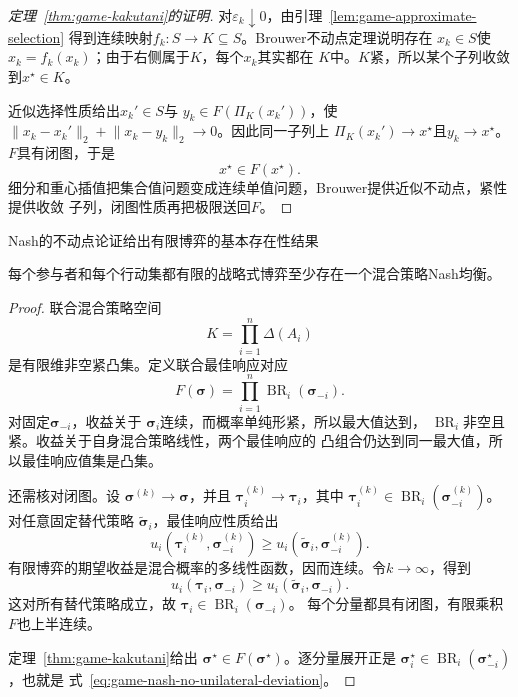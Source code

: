 \begin{proof}[定理~\ref{thm:game-kakutani}的证明]
对\(\varepsilon_k\downarrow0\)，由引理~\ref{lem:game-approximate-selection}
得到连续映射\(f_k:S\to K\subseteq S\)。Brouwer不动点定理说明存在
\(x_k\in S\)使\(x_k=f_k(x_k)\)；由于右侧属于\(K\)，每个\(x_k\)其实都在
\(K\)中。\(K\)紧，所以某个子列收敛到\(x^\star\in K\)。

近似选择性质给出\(x_k'\in S\)与
\(y_k\in F(\Pi_K(x_k'))\)，使
\(\lVert x_k-x_k'\rVert_2+\lVert x_k-y_k\rVert_2\to0\)。因此同一子列上
\(\Pi_K(x_k')\to x^\star\)且\(y_k\to x^\star\)。\(F\)具有闭图，于是
\[
  x^\star\in F(x^\star).
\]
细分和重心插值把集合值问题变成连续单值问题，Brouwer提供近似不动点，紧性提供收敛
子列，闭图性质再把极限送回\(F\)。
\end{proof}
Nash的不动点论证给出有限博弈的基本存在性结果
\begin{theorem}[有限博弈存在混合Nash均衡]
\label{thm:game-nash-existence}
每个参与者和每个行动集都有限的战略式博弈至少存在一个混合策略Nash均衡。
\end{theorem}

\begin{proof}
联合混合策略空间
\[
  K=\prod_{i=1}^{n}\Delta(A_i)
\]
是有限维非空紧凸集。定义联合最佳响应对应
\[
  F(\bm{\sigma})
  =
  \prod_{i=1}^{n}
  \operatorname{BR}_i(\bm{\sigma}_{-i}).
\]
对固定\(\bm{\sigma}_{-i}\)，收益关于
\(\bm{\sigma}_i\)连续，而概率单纯形紧，所以最大值达到，
\(\operatorname{BR}_i\)非空且紧。收益关于自身混合策略线性，两个最佳响应的
凸组合仍达到同一最大值，所以最佳响应值集是凸集。

还需核对闭图。设
\(\bm{\sigma}^{(k)}\to\bm{\sigma}\)，并且
\(\bm{\tau}_i^{(k)}\to\bm{\tau}_i\)，其中
\(\bm{\tau}_i^{(k)}
\in\operatorname{BR}_i(\bm{\sigma}_{-i}^{(k)})\)。对任意固定替代策略
\(\widetilde{\bm{\sigma}}_i\)，最佳响应性质给出
\[
  u_i(\bm{\tau}_i^{(k)},\bm{\sigma}_{-i}^{(k)})
  \geq
  u_i(\widetilde{\bm{\sigma}}_i,\bm{\sigma}_{-i}^{(k)}).
\]
有限博弈的期望收益是混合概率的多线性函数，因而连续。令\(k\to\infty\)，得到
\[
  u_i(\bm{\tau}_i,\bm{\sigma}_{-i})
  \geq
  u_i(\widetilde{\bm{\sigma}}_i,\bm{\sigma}_{-i}).
\]
这对所有替代策略成立，故
\(\bm{\tau}_i\in\operatorname{BR}_i(\bm{\sigma}_{-i})\)。
每个分量都具有闭图，有限乘积\(F\)也上半连续。

定理~\ref{thm:game-kakutani}给出
\(\bm{\sigma}^\star\in F(\bm{\sigma}^\star)\)。逐分量展开正是
\(\bm{\sigma}_i^\star
\in\operatorname{BR}_i(\bm{\sigma}_{-i}^\star)\)，也就是
式~\eqref{eq:game-nash-no-unilateral-deviation}。
\end{proof}

